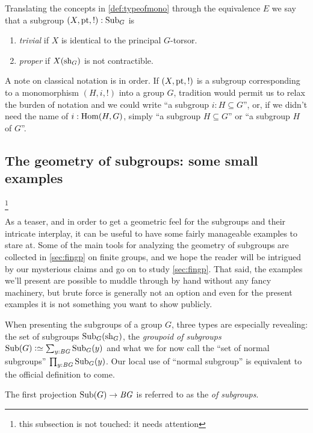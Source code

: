   Translating the concepts in \cref{def:typeofmono} through the equivalence $E$ we say that a subgroup $(X,\mathrm{pt},!):\mathrm{Sub}_G$ is
      \begin{enumerate}
      \item \emph{trivial} if $X$ is identical to the principal $G$-torsor.
      \item \emph{proper} if $X(\mathrm{sh}_G)$ is not contractible.
      \end{enumerate}

      \begin{remark}
      \label{rem:notationsubgroup}
      A note on classical notation is in order.  
If $(X,\mathrm{pt},!)$ is a subgroup corresponding to a monomorphism $(H,i,!)$ into a group $G$, tradition would permit us to relax the burden of notation and we could write ``a subgroup $i:H\subseteq G$'', or, if we didn't need the name of $i:\Hom(H,G)$, simply ``a subgroup $H\subseteq G$'' or ``a subgroup $H$ of $G$''. 
    \end{remark}

\subsection{The geometry of subgroups: some small examples}\footnote{this subsection is not touched: it needs attention}
\label{smallsubgpex}

As a teaser, and in order to get a geometric feel for the subgroups and their intricate interplay, it can be useful to have some fairly manageable examples to stare at.  
Some of the main tools for analyzing the geometry of subgroups are collected in \cref{sec:fingp} on finite groups, and we hope the reader will be intrigued by our mysterious claims and go on to study \cref{sec:fingp}.
That said, the examples we'll present are possible to muddle through by hand without any fancy machinery, but brute force is generally not an option and even for the present examples it is not something you want to show publicly.

When presenting the subgroups of a group $G$, three types are especially revealing: the set of subgroups $\mathrm{Sub}_G(\mathrm{sh}_G)$, the \emph{groupoid of subgroups} $\typesubgroup(G)\defequi\sum_{y:\BG}\typesubgroup_G(y)$ and what we for now call the ``set of normal subgroups'' $\prod_{y:\mathit{B}\mathit{G}}\mathrm{Sub}_G(y)$.   Our local use of ``normal subgroup'' is equivalent to the official definition to come.  

The first projection $\mathrm{Sub}(G)\to \mathit{B}\mathit{G}$ is referred to as the \emph{\covering of subgroups}.

